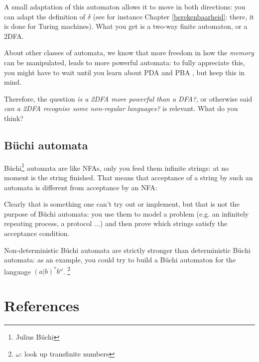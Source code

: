A small adaptation of this automaton allows it to move in both
directions: you can adapt the definition of $\delta$ (see for instance
Chapter \ref{berekenbaarheid}: there, it is done for Turing
machines). What you get is a two-way finite automaton, or a 2DFA.

About other classes of automata, we know that more freedom in how the
{\em memory} can be manipulated, leads to more powerful automata: to
fully appreciate this, you might have to wait until you learn about
PDA and PBA , but keep this in mind.

Therefore, the question {\em is a 2DFA more powerful than a DFA?}, or
otherwise said {\em can a 2DFA recognise some non-regular languages?}
is relevant. What do you think?


\clearpage
\subsection{B\"{u}chi automata}

B\"{u}chi\footnote{Julius B\"{u}chi} automata are like NFAs, only you
feed them infinite strings: at no moment is the string finished.
That means that acceptance of a string by such an automata is
different from acceptance by an NFA:


Clearly that is something one can't try out or implement, but that is
not the purpose of B\"{u}chi automata: you use them to model a problem
(e.g. an infinitely repeating process, a protocol ...) and then prove
which strings satisfy the acceptance condition.

Non-deterministic B\"{u}chi automata are strictly stronger than
deterministic B\"{u}chi automata: as an example, you could try to
build a B\"{u}chi automaton for the language $(a|b)^*b^\omega$. \footnote{$\omega$: look up transfinite numbers}



\clearpage
\section{References}

